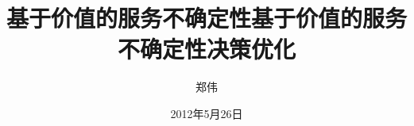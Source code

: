 
\subject{计算机科学与技术}
\author{郑伟}
\date{2012年5月26日}

\ifxueweidoctor
  \title{基于价值的服务不确定性} %
\fi
\ifxueweimaster
  \title{基于价值的服务不确定性决策优化}
\fi

\makecover
\clearpage
\setcounter{page}{1}